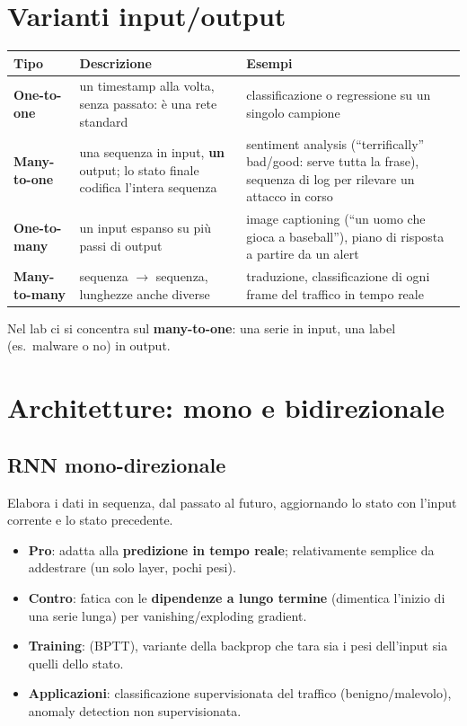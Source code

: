 \section{Varianti input/output}
\begin{center}
\small
\renewcommand{\arraystretch}{1.25}
\begin{tabularx}{\textwidth}{>{\bfseries}l X X}
\toprule
Tipo & Descrizione & Esempi\\
\midrule
One-to-one & un timestamp alla volta, senza passato: è una rete standard & classificazione o regressione su un singolo campione\\
Many-to-one & una sequenza in input, \textbf{un} output; lo stato finale codifica l'intera sequenza & sentiment analysis (``terrifically'' bad/good: serve tutta la frase), sequenza di log per rilevare un attacco in corso\\
One-to-many & un input espanso su più passi di output & image captioning (``un uomo che gioca a baseball''), piano di risposta a partire da un alert\\
Many-to-many & sequenza $\to$ sequenza, lunghezze anche diverse & traduzione, classificazione di ogni frame del traffico in tempo reale\\
\bottomrule
\end{tabularx}
\end{center}
Nel lab ci si concentra sul \textbf{many-to-one}: una serie in input, una label (es.\ malware o no) in output.

\section{Architetture: mono e bidirezionale}
\subsection{RNN mono-direzionale}
Elabora i dati in sequenza, dal passato al futuro, aggiornando lo stato con l'input corrente e lo stato precedente.
\begin{itemize}
  \item \textbf{Pro}: adatta alla \textbf{predizione in tempo reale}; relativamente semplice da addestrare (un solo layer, pochi pesi).
  \item \textbf{Contro}: fatica con le \textbf{dipendenze a lungo termine} (dimentica l'inizio di una serie lunga) per
        vanishing/exploding gradient.
  \item \textbf{Training}:  (BPTT), variante della backprop che tara sia i pesi dell'input sia quelli
        dello stato.
  \item \textbf{Applicazioni}: classificazione supervisionata del traffico (benigno/malevolo), anomaly detection non supervisionata.
\end{itemize}

